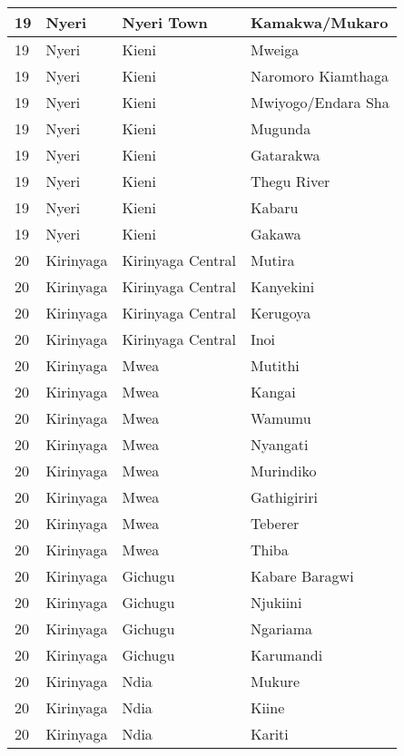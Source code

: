 \begin{table}[!ht]
\begin{tabular}{|l|l|l|l|}
        19 & Nyeri & Nyeri Town & Kamakwa/Mukaro \\ \hline
        19 & Nyeri & Kieni & Mweiga \\ \hline
        19 & Nyeri & Kieni & Naromoro Kiamthaga \\ \hline
        19 & Nyeri & Kieni & Mwiyogo/Endara Sha \\ \hline
        19 & Nyeri & Kieni & Mugunda \\ \hline
        19 & Nyeri & Kieni & Gatarakwa \\ \hline
        19 & Nyeri & Kieni & Thegu River \\ \hline
        19 & Nyeri & Kieni & Kabaru \\ \hline
        19 & Nyeri & Kieni & Gakawa \\ \hline
        20 & Kirinyaga & Kirinyaga Central & Mutira \\ \hline
        20 & Kirinyaga & Kirinyaga Central & Kanyekini \\ \hline
        20 & Kirinyaga & Kirinyaga Central & Kerugoya \\ \hline
        20 & Kirinyaga & Kirinyaga Central & Inoi \\ \hline
        20 & Kirinyaga & Mwea & Mutithi \\ \hline
        20 & Kirinyaga & Mwea & Kangai \\ \hline
        20 & Kirinyaga & Mwea & Wamumu \\ \hline
        20 & Kirinyaga & Mwea & Nyangati \\ \hline
        20 & Kirinyaga & Mwea & Murindiko \\ \hline
        20 & Kirinyaga & Mwea & Gathigiriri \\ \hline
        20 & Kirinyaga & Mwea & Teberer \\ \hline
        20 & Kirinyaga & Mwea & Thiba \\ \hline
        20 & Kirinyaga & Gichugu & Kabare Baragwi \\ \hline
        20 & Kirinyaga & Gichugu & Njukiini \\ \hline
        20 & Kirinyaga & Gichugu & Ngariama \\ \hline
        20 & Kirinyaga & Gichugu & Karumandi \\ \hline
        20 & Kirinyaga & Ndia & Mukure \\ \hline
        20 & Kirinyaga & Ndia & Kiine \\ \hline
        20 & Kirinyaga & Ndia & Kariti \\ \hline

\end{tabular}
\end{table}

